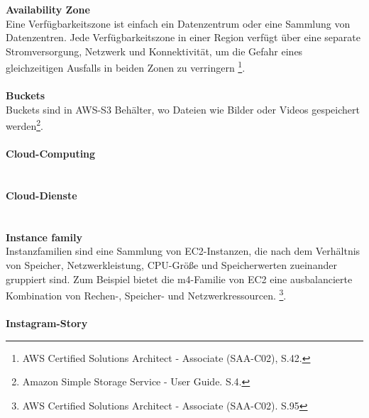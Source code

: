 \textbf{Availability Zone}\\
Eine Verfügbarkeitszone ist einfach ein Datenzentrum oder eine Sammlung von Datenzentren. Jede Verfügbarkeitszone in einer Region verfügt über eine separate Stromversorgung, Netzwerk und Konnektivität, um die Gefahr eines gleichzeitigen Ausfalls in beiden Zonen zu verringern \footnote{AWS Certified Solutions Architect - Associate (SAA-C02), S.42.\cite{AWS1}}.
\\\\
\textbf{Buckets}\\
Buckets sind in AWS-S3 Behälter, wo Dateien wie Bilder oder Videos gespeichert werden\footnote{Amazon Simple Storage Service - User Guide. S.4.\cite{AMZ18}}.
\\\\
\textbf{Cloud-Computing}\\
\\\\
\textbf{Cloud-Dienste}\\
\\\\
\textbf{Instance family}\\
Instanzfamilien sind eine Sammlung von EC2-Instanzen, die nach dem Verhältnis von Speicher, Netzwerkleistung, CPU-Größe und Speicherwerten zueinander gruppiert sind. Zum Beispiel bietet die m4-Familie von EC2 eine ausbalancierte Kombination von Rechen-, Speicher- und Netzwerkressourcen. \footnote{AWS Certified Solutions Architect - Associate (SAA-C02). S.95\cite{AWS1}}.
\\\\
\textbf{Instagram-Story}\\
